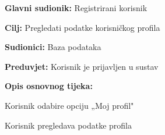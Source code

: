 				
				\noindent {}
				\begin{packed_item}
					
					\item \textbf{Glavni sudionik:} Registrirani korisnik
					\item  \textbf{Cilj:} Pregledati podatke korisničkog profila
					\item  \textbf{Sudionici:} Baza podataka
					\item  \textbf{Preduvjet:} Korisnik je prijavljen u sustav
					\item  \textbf{Opis osnovnog tijeka:}
					
					\item[] \begin{packed_enum}
						
						\item Korisnik odabire opciju „Moj profil"
						\item Korisnik pregledava podatke profila
					\end{packed_enum}
					
				\end{packed_item}
				
